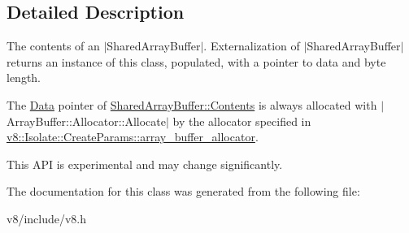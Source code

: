 \subsection{Detailed Description}
The contents of an $\vert$\+Shared\+Array\+Buffer$\vert$. Externalization of $\vert$\+Shared\+Array\+Buffer$\vert$ returns an instance of this class, populated, with a pointer to data and byte length.

The \mbox{\hyperlink{classv8_1_1Data}{Data}} pointer of \mbox{\hyperlink{classv8_1_1SharedArrayBuffer_1_1Contents}{Shared\+Array\+Buffer\+::\+Contents}} is always allocated with $\vert$\+Array\+Buffer\+::\+Allocator\+::\+Allocate$\vert$ by the allocator specified in \mbox{\hyperlink{structv8_1_1Isolate_1_1CreateParams_a7c663f70b64290392eeaf164f57585f9}{v8\+::\+Isolate\+::\+Create\+Params\+::array\+\_\+buffer\+\_\+allocator}}.

This A\+PI is experimental and may change significantly. 

The documentation for this class was generated from the following file\+:\begin{DoxyCompactItemize}
\item 
v8/include/v8.\+h\end{DoxyCompactItemize}
